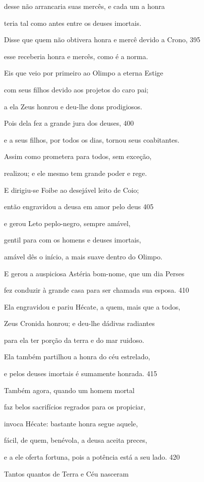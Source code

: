 desse não arrancaria suas mercês, e cada um a honra

teria tal como antes entre os deuses imortais.

Disse que quem não obtivera honra e mercê devido a Crono, \num{395}

esse receberia honra e mercês, como é a norma.

Eis que veio por primeiro ao Olimpo a eterna Estige

com seus filhos devido aos projetos do caro pai;

a ela Zeus honrou e deu-lhe dons prodigiosos.

Pois dela fez a grande jura dos deuses, \num{400}

e a seus filhos, por todos os dias, tornou seus coabitantes.

Assim como prometera para todos, sem exceção,

realizou; e ele mesmo tem grande poder e rege.

\quad{}E dirigiu-se Foibe ao desejável leito de Coio;

então engravidou a deusa em amor pelo deus \num{405}

e gerou Leto peplo-negro, sempre amável,

gentil para com os homens e deuses imortais,

amável dês o início, a mais suave dentro do Olimpo.

E gerou a auspiciosa Astéria bom-nome, que um dia Perses

fez conduzir à grande casa para ser chamada sua esposa. \num{410}

\quad{}Ela engravidou e pariu Hécate, a quem, mais que a todos,

Zeus Cronida honrou; e deu-lhe dádivas radiantes

para ela ter porção da terra e do mar ruidoso.

Ela também partilhou a honra do céu estrelado,

e pelos deuses imortais é sumamente honrada. \num{415}

Também agora, quando um homem mortal

faz belos sacrifícios regrados para os propiciar,

invoca Hécate: bastante honra segue aquele,

fácil, de quem, benévola, a deusa aceita preces,

e a ele oferta fortuna, pois a potência está a seu lado. \num{420}

Tantos quantos de Terra e Céu nasceram

